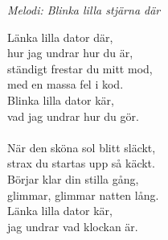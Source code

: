 {\footnotesize\textit{Melodi: Blinka lilla stjärna där}}\par
\vspace{10pt}
Länka lilla dator där,\\
hur jag undrar hur du är,\\
ständigt frestar du mitt mod,\\
med en massa fel i kod.\\
Blinka lilla dator kär,\\
vad jag undrar hur du gör.\\
\\
När den sköna sol blitt släckt,\\
strax du startas upp så käckt.\\
Börjar klar din stilla gång,\\
glimmar, glimmar natten lång.\\
Länka lilla dator kär,\\
jag undrar vad klockan är.
